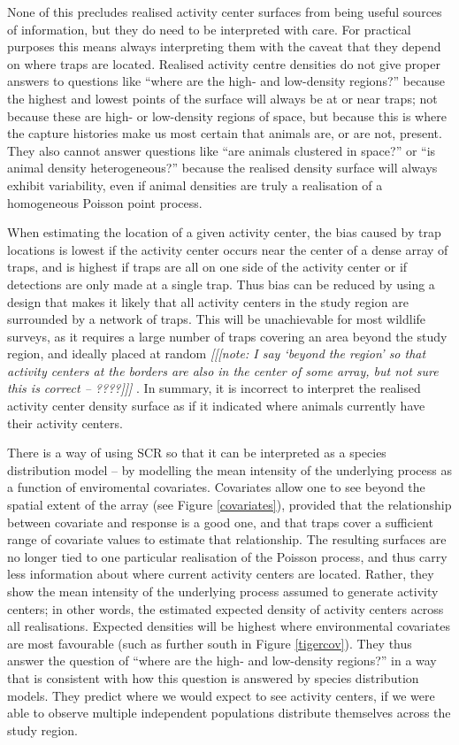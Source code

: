 \documentclass[10pt,a4paper]{article}
\begin{document}
None of this precludes realised activity center surfaces from being useful sources of information, but they do need to be interpreted with care. For practical purposes this means always interpreting them with the caveat that they depend on where traps are located. Realised activity centre densities do not give proper answers to questions like ``where are the high- and low-density regions?'' because the highest and lowest points of the surface will always be at or near traps; not because these are high- or low-density regions of space, but because this is where the capture histories make us most certain that animals are, or are not, present. They also cannot answer questions like ``are animals clustered in space?'' or ``is animal density heterogeneous?'' because the realised density surface will always exhibit variability, even if animal densities are truly a realisation of a homogeneous Poisson point process.

When estimating the location of a given activity center, the bias caused by trap locations is lowest if the activity center occurs near the center of a dense array of traps, and is highest if traps are all on one side of the activity center or if detections are only made at a single trap. Thus bias can be reduced by using a design that makes it likely that all activity centers in the study region are surrounded by a network of traps. This will be unachievable for most wildlife surveys, as it requires a large number of traps covering an area beyond the study region, and ideally placed at random {\it [[[note: I say `beyond the region' so that activity centers at the borders are also in the center of some array, but not sure this is correct -- ????]]]} . In summary, it is incorrect to interpret the realised activity center density surface as if it indicated where animals currently have their activity centers. 

There is a way of using SCR so that it can be interpreted as a species distribution model -- by modelling the mean intensity of the underlying process as a function of enviromental covariates. Covariates allow one to see beyond the spatial extent of the array (see Figure \ref{covariates}), provided that the relationship between covariate and response is a good one, and that traps cover a sufficient range of covariate values to estimate that relationship. The resulting surfaces are no longer tied to one particular realisation of the Poisson process, and thus carry less information about where current activity centers are located. Rather, they show the mean intensity of the underlying process assumed to generate activity centers; in other words, the estimated expected density of activity centers across all realisations. Expected densities will be highest where environmental covariates are most favourable (such as further south in Figure \ref{tigercov}). They thus answer the question of ``where are the high- and low-density regions?'' in a way that is consistent with how this question is answered by species distribution models. They predict where we would expect to see activity centers, if we were able to observe multiple independent populations distribute themselves across the study region. 
\end{document}
